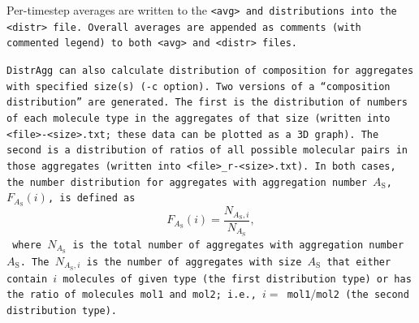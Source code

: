 Per-timestep averages are written to the \tt{<avg>} and  distributions into the
\tt{<distr>} file. Overall averages are appended as comments (with commented
legend) to both \tt{<avg>} and \tt{<distr>} files.

\tt{DistrAgg} can also calculate distribution of composition for aggregates with
specified size(s) (\tt{-c} option). Two versions of a \enquote{composition
distribution} are generated. The first is the distribution of numbers of each
molecule type in the aggregates of that size (written into
\tt{<file>-<size>.txt}; these data can be plotted as a 3D graph). The second is
a distribution of ratios of all possible molecular pairs in those aggregates
(written into \tt{<file>_r-<size>.txt}). In both cases, the number distribution
for aggregates with aggregation number $A_\text{S}$, $F_{A_\text{S}}(i)$, is
defined as
%
\begin{equation}
  F_{A_\text{S}}(i) = \frac{N_{A_\text{S},i}}{N_{A_\text{S}}},
\end{equation}
%
where $N_{A_\text{S}}$ is the total number of
aggregates with aggregation number $A_\text{S}$. The
$N_{A_\text{S},i}$ is the number of aggregates with size $A_\text{S}$ that
either contain $i$ molecules of given type (the first distribution type) or has
the ratio of molecules \tt{mol1} and \tt{mol2}; i.e., $i=$ \tt{mol1}$/$\tt{mol2}
(the second distribution type).

